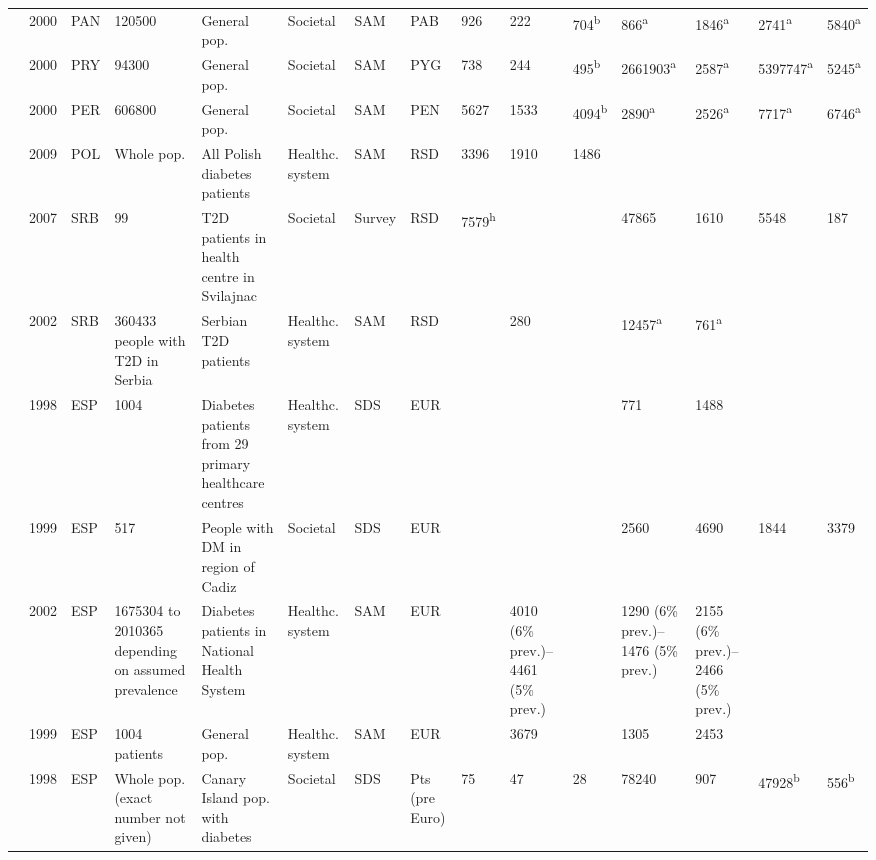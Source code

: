 {\begin{landscape}
\begin{tabularx}{\linewidth}{Z X X Z Z X X X X X X X X Y Y}
\textcite{Barcelo2003} & 2000 & PAN & 120500 & General pop. & Societal & SAM & PAB & 926 & 222 & 704\textsuperscript{b} & 866\textsuperscript{a} & 1846\textsuperscript{a} & 2741\textsuperscript{a} & 5840\textsuperscript{a} \\
\textcite{Barcelo2003} & 2000 & PRY & 94300 & General pop. & Societal & SAM & PYG & 738 & 244 & 495\textsuperscript{b} & 2661903\textsuperscript{a} & 2587\textsuperscript{a} & 5397747\textsuperscript{a} & 5245\textsuperscript{a} \\
\textcite{Barcelo2003} & 2000 & PER & 606800 & General pop. & Societal & SAM & PEN & 5627 & 1533 & 4094\textsuperscript{b} & 2890\textsuperscript{a} & 2526\textsuperscript{a} & 7717\textsuperscript{a} & 6746\textsuperscript{a} \\
\textcite{Lesniowska2014} & 2009 & POL & Whole pop. & All Polish diabetes patients & Healthc. system & SAM & RSD & 3396 & 1910 & 1486 &  &  &  &  \\
\textcite{Biorac2009a} & 2007 & SRB & 99 & T2D patients in health centre in Svilajnac & Societal & Survey & RSD & 7579\textsuperscript{h} &  &  & 47865 & 1610 & 5548 & 187 \\
\textcite{Bjegovic2007b} & 2002 & SRB & 360433 people with T2D in Serbia & Serbian T2D patients & Healthc. system & SAM & RSD &  & 280 &  & 12457\textsuperscript{a} & 761\textsuperscript{a} &  &  \\
\textcite{Mata2002a} & 1998 & ESP & 1004 & Diabetes patients from 29 primary   healthcare centres & Healthc. system & SDS & EUR &  &  &  & 771 & 1488 &  &  \\
\textcite{Ballesta2006} & 1999 & ESP & 517 & People with DM in region of Cadiz & Societal & SDS & EUR &  &  &  & 2560 & 4690 & 1844 & 3379 \\
\textcite{Oliva2004a} & 2002 & ESP & 1675304 to 2010365 depending on assumed   prevalence & Diabetes patients in National Health System & Healthc. system & SAM & EUR &  & 4010 (6\% prev.)--4461 (5\% prev.) &  & 1290 (6\% prev.)--1476 (5\% prev.) & 2155 (6\% prev.)--2466 (5\% prev.) &  &  \\
\textcite{Jonsson2002b} & 1999 & ESP & 1004 patients & General pop. & Healthc. system & SAM & EUR &  & 3679 &  & 1305 & 2453 &  &  \\
\textcite{LopezBastida2002a} & 1998 & ESP & Whole pop. (exact number not given) & Canary Island pop. with diabetes & Societal & SDS & Pts (pre Euro) & 75 & 47 & 28 & 78240 & 907 & 47928\textsuperscript{b} & 556\textsuperscript{b} \\

\end{tabularx}
\end{landscape}}
